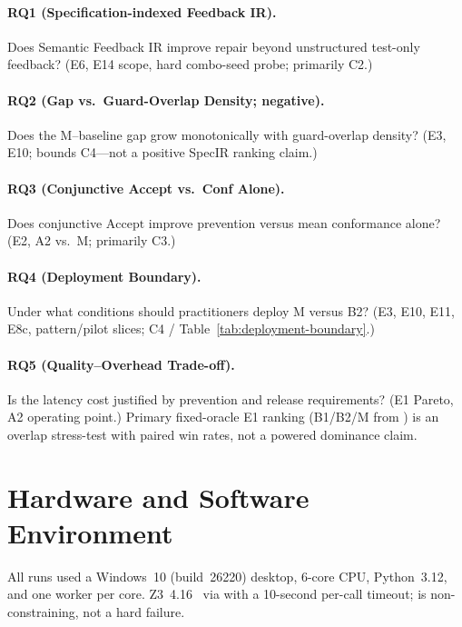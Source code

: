 \paragraph{RQ1 (Specification-indexed Feedback IR).}
Does Semantic Feedback IR improve repair beyond unstructured test-only
feedback? (E6, E14 scope, hard combo-seed probe; primarily C2.)

\paragraph{RQ2 (Gap vs.\ Guard-Overlap Density; negative).}
Does the M--baseline gap grow monotonically with guard-overlap density?
(E3, E10; bounds C4---not a positive SpecIR ranking claim.)

\paragraph{RQ3 (Conjunctive Accept vs.\ Conf Alone).}
Does conjunctive $\mathrm{Accept}$ improve prevention versus mean
conformance alone? (E2, A2 vs.\ M; primarily C3.)

\paragraph{RQ4 (Deployment Boundary).}
Under what conditions should practitioners deploy M versus B2?
(E3, E10, E11, E8c, pattern/pilot slices; C4 /
Table~\ref{tab:deployment-boundary}.)

\paragraph{RQ5 (Quality--Overhead Trade-off).}
Is the latency cost justified by prevention and release requirements?
(E1 Pareto, A2 operating point.)
Primary fixed-oracle E1 ranking (B1/B2/M from )
is an overlap stress-test with paired win rates, not a powered dominance
claim.

\section{Hardware and Software Environment}
\label{sec:exp:environment}

All runs used a Windows~10 (build~26220) desktop, 6-core CPU,
Python~3.12, and one  worker per core.
Z3~4.16~\citep{demoura2008z3,barrett2018smt} via  with a
10-second per-call timeout;  is non-constraining, not a hard
failure.

